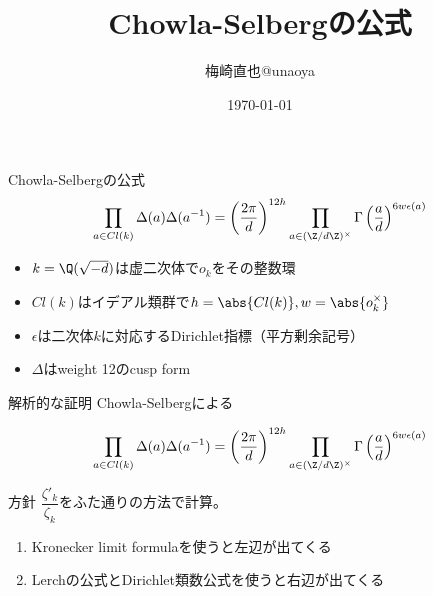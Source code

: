 \documentclass[dvipdfmx,aspectratio=169]{beamer}
\title{Chowla-Selbergの公式}
\author{梅崎直也@unaoya}
\date{\today}
\begin{document}
\begin{frame}
\maketitle
\end{frame}

\begin{frame}{Chowla-Selbergの公式}
\begin{align*}
\prod_{a\in Cl(k)}\Delta(a)\Delta(a^{-1})=\left(\frac{2\pi}{d}\right)^{12h}\prod_{a\in(\Z/d\Z)^\times}\Gamma\left(\frac{a}{d}\right)^{6w\epsilon(a)}
\end{align*}

\begin{itemize}
\item $k=\Q(\sqrt{-d})$は虚二次体で$o_k$をその整数環
\item $Cl(k)$はイデアル類群で$h=\abs{Cl(k)}, w=\abs{o_k^\times}$
\item $\epsilon$は二次体$k$に対応するDirichlet指標（平方剰余記号）
\item $\Delta$はweight 12のcusp form
\end{itemize}
\end{frame}

\begin{frame}{解析的な証明}
Chowla-Selbergによる

\begin{align*}
\prod_{a\in Cl(k)}\Delta(a)\Delta(a^{-1})=\left(\frac{2\pi}{d}\right)^{12h}\prod_{a\in(\Z/d\Z)^\times}\Gamma\left(\frac{a}{d}\right)^{6w\epsilon(a)}
\end{align*}

\begin{block}{方針}
$\dfrac{\zeta'_k}{\zeta_k}$をふた通りの方法で計算。
\end{block}
\begin{enumerate}
\item Kronecker limit formulaを使うと左辺が出てくる
\item Lerchの公式とDirichlet類数公式を使うと右辺が出てくる
\end{enumerate}
\end{frame}
\end{document}
